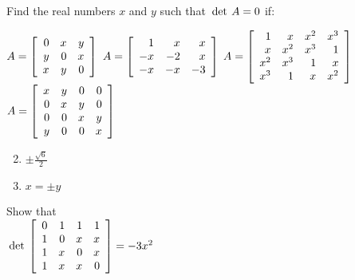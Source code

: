 \begin{multicols}{2}
\begin{ex}
\begin{sol}
\begin{enumerate}[label={\alph*.}]
\end{enumerate}
\end{sol}
\end{ex}

\begin{ex}
Find the real numbers $x$ and $y$ such that $\thinspace\operatorname{det \medspace} A = 0$ if:


\begin{exenumerate}
\exitem $A = \left[ \begin{array}{rrr}
0 & x & y \\
y & 0 & x \\
x & y & 0 
\end{array}\right]$
\exitem $A = \left[ \begin{array}{rrr}
1 & x & x \\
-x & -2 & x \\
-x & -x & -3 
\end{array}\right]$
\exitem* $A = \left[ \begin{array}{rrrr}
1 & x & x^2 & x^3  \\
x & x^2 & x^3 & 1 \\
x^2 & x^3 & 1 & x \\
x^3 & 1 & x & x^2 
\end{array}\right]$
\exitem* $A = \left[ \begin{array}{rrrr}
x & y & 0 & 0  \\
0 & x & y & 0 \\
0 & 0 & x & y \\
y & 0 & 0 & x 
\end{array}\right]$
\end{exenumerate}
\begin{sol}
\begin{enumerate}[label={\alph*.}]
\setcounter{enumi}{1}
\item  $ \pm \frac{\sqrt{6}}{2}$


\setcounter{enumi}{3}
\item  $x = \pm y$

\end{enumerate}
\end{sol}
\end{ex}

\begin{ex}
Show that \\ $\thinspace\operatorname{det\medspace} \left[ \begin{array}{rrrr}
0 & 1 & 1 & 1  \\
1 & 0 & x & x \\
1 & x & 0 & x \\
1 & x & x & 0 
\end{array}\right] = -3x^2$
\end{ex}


\end{multicols}
